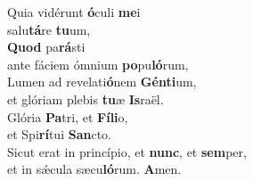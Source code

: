 \evenverse Quia vidérunt \textbf{ó}culi \textbf{me}i~\*\\
\evenverse salu\textbf{tá}re \textbf{tu}um,\\
\oddverse \textbf{Quod} pa\textbf{rá}sti~\*\\
\oddverse ante fáciem ómnium \textbf{po}pu\textbf{ló}rum,\\
\evenverse Lumen ad revelati\textbf{ó}nem \textbf{Gén}\textbf{ti}um,~\*\\
\evenverse et glóriam plebis \textbf{tu}æ \textbf{Is}raël.\\
\oddverse Glória \textbf{Pa}tri, et \textbf{Fí}\textbf{li}o,~\*\\
\oddverse et Spi\textbf{rí}tui \textbf{San}cto.\\
\evenverse Sicut erat in princípio, et \textbf{nunc}, et \textbf{sem}per,~\*\\
\evenverse et in sǽcula sæcu\textbf{ló}rum. \textbf{A}men.\\

